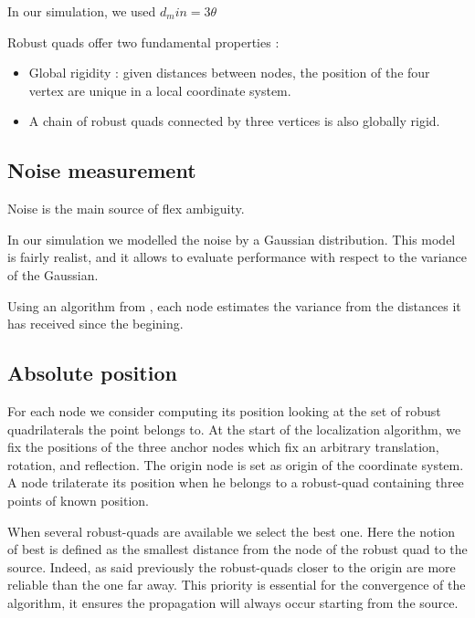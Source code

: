 \documentclass[letterpaper, 10 pt, conference]{ieeeconf}  %
\begin{document}
In our simulation, we used $d_min = 3 \theta $



Robust quads offer two fundamental properties :
\begin{itemize}
\item Global rigidity : given distances between nodes, the position of the four vertex are unique in a local coordinate system.
\item A chain of robust quads connected by three vertices is also globally rigid.

\end{itemize}






\subsection{Noise measurement}
Noise is the main source of flex ambiguity. 

In our simulation we modelled the noise by a Gaussian distribution.
This model is fairly realist, and it allows to evaluate performance with respect to the variance of the Gaussian.


Using an algorithm from \cite{Knuth} , each node estimates the variance from the distances it has received since the begining.




\subsection{Absolute position}
For each node we consider computing its position looking at the set of robust quadrilaterals the point belongs to. At the start of the localization algorithm, we fix the positions of the three anchor nodes which fix an arbitrary translation, rotation, and reflection. The origin node is set as origin of the coordinate system. A node trilaterate its position when he belongs to a robust-quad containing three points of known position.

When several robust-quads are available we select the best one. Here the notion of best is defined as the smallest distance from the node of the robust quad to the source. Indeed, as said previously the robust-quads closer to the origin are more reliable than the one far away. This priority is essential for the convergence of the algorithm, it ensures the propagation will always occur starting from the source.
\end{document}
